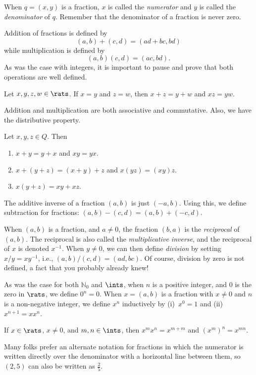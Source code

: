 When $q=(x,y)$ is a fraction, $x$ is called the \textit{numerator}
and $y$ is called the \textit{denominator} of $q$.  
Remember that the denominator of a fraction is never zero.

Addition of fractions is defined by 
\[
(a,b)+(c,d) = (ad+bc,bd)
\]
while multiplication is defined by
\[
(a,b)(c,d) = (ac,bd).
\]
As was the case with integers, it is important to pause
and prove that both operations are well defined.

\begin{theorem}
Let $x,y,z,w\in\rats$.
If $x=y$ and $z=w$, then $x+z=y+w$ and $xz=yw$.
\end{theorem} 

Addition and multiplication are both associative and commutative. 
Also, we have the distributive property.

\begin{theorem}
Let $x,y,z\in Q$.  Then
\begin{enumerate}
\item $x+y=y+x$ and $xy=yx$.
\item $x+(y+z) = (x+y)+z$ and $x(yz)=(xy)z$.
\item $x(y+z)=xy+xz$.
\end{enumerate}
\end{theorem}

The additive inverse of a fraction $(a,b)$ is just $(-a,b)$.
Using this, we define subtraction for fractions:
$(a,b)-(c,d)=(a,b)+(-c,d)$.

When $(a,b)$ is a fraction, and $a\neq 0$, the fraction $(b,a)$ is the 
\textit{reciprocal} of $(a,b)$.  The reciprocal is also
called the \textit{multiplicative inverse}, and the reciprocal 
of $x$ is denoted $x^{-1}$.  When $y\neq0$, we can then define
\textit{division} by setting $x/y=xy^{-1}$, i.e.,
$(a,b)/(c,d)=(ad, bc)$.  Of course, division by zero is not
defined, a fact that you probably already knew!

As was the case for  both $\mathbb{N}_0$ and $\ints$, when
$n$ is a positive integer, and $0$ is the zero in $\rats$,
we define $0^n=0$.  When $x=(a,b)$ is a fraction with $x\neq0$
and $n$ is a non-negative integer, we define $x^n$ inductively
by (i)~$x^0=1$ and (ii)~$x^{n+1}=xx^n$.

\begin{theorem}
If $x\in\rats$, $x\neq0$, and $m,n\in\ints$, then
$x^mx^n=x^{m+m}$ and $(x^m)^n=x^{mn}$.
\end{theorem}

Many folks prefer an alternate notation for fractions in
which the numerator is written directly over the denominator
with a horizontal line between them, so $(2,5)$ can
also be written as $\frac{2}{5}$.

